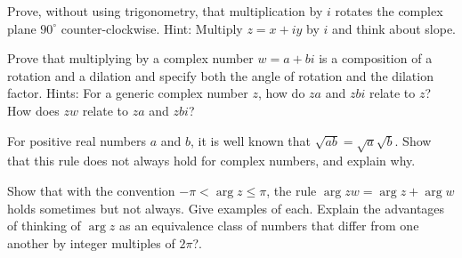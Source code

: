 \documentclass[space,nooutcomes]{ximera}
\begin{document}
\begin{problem}
Prove, without using trigonometry, that multiplication by $i$ rotates the complex plane $90^{\circ}$ counter-clockwise.  Hint: Multiply $z=x+iy$ by $i$ and think about slope.
\vfill 
\end{problem}

\begin{problem}
Prove that multiplying by a complex number $w = a + bi$ is a composition of a rotation and a dilation and specify both the angle of rotation and the dilation factor.  Hints: For a generic complex number $z$, how do $za$ and $zbi$ relate to $z$?  How does $zw$ relate to $za$ and $zbi$?  
\vfill 
\end{problem}

\begin{problem}
For positive real numbers $a$ and $b$, it is well known that $\sqrt{ab}=\sqrt{a}\sqrt{b}$.  Show that this rule does not always hold for complex numbers, and explain why.  
\vfill 
\end{problem}

\begin{problem}
Show that with the convention $-\pi<\arg{z}\le\pi$, the rule $\arg{zw}=\arg{z}+\arg{w}$ holds sometimes but not always.  Give examples of each.  Explain the advantages of thinking of $\arg{z}$ as an equivalence class of numbers that differ from one another by integer multiples of $2\pi$?.
\vfill 
\end{problem}
%
%
%
\end{document}

